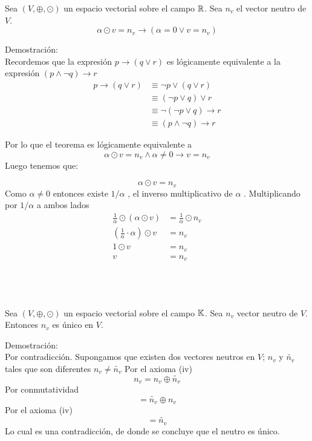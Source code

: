 \begin{theorem}

Sea $(V,\oplus ,\odot )$ un espacio vectorial sobre el campo $\mathbb{R}$. Sea $n_v$ el vector neutro de $V$.
$$\alpha \odot v=n_v   \rightarrow  (  \alpha =0   \vee    v=n_v   )$$
\end{theorem}
Demostración:~\\

Recordemos que la expresión $ p\rightarrow (q\vee r)$ es lógicamente equivalente a la expresión $(p\wedge \neg q)\rightarrow r$
\begin{align*}
    p\rightarrow(q\vee r)&\equiv  \neg p\vee (q\vee r)\\
    &\equiv  (\neg p\vee q)\vee r\\
    &\equiv  \neg (\neg p\vee q)\rightarrow r\\
    &\equiv  (p\wedge \neg q)\rightarrow r
\end{align*}

Por lo que el teorema es lógicamente equivalente a 
$$\alpha \odot v=n_v  \wedge  \alpha \neq 0  \rightarrow   v=n_v $$  
Luego tenemos que:

$$\alpha \odot v=n_v$$
Como $ \alpha \neq 0$ entonces existe $1/\alpha$ , el inverso multiplicativo de $\alpha$ . Multiplicando por $1/\alpha $ a ambos lados 
\begin{align*}
    \frac{1}{\alpha} \odot (\alpha \odot v)&=\frac{1}{\alpha} \odot n_v\\
    \left(\frac{1}{\alpha} \cdot \alpha \right)\odot v&=n_v\\
    1\odot v&=n_v\\
    v&=n_v\\
\end{align*}


~\\
~\\


\begin{theorem}
Sea $(V,\oplus ,\odot )$ un espacio vectorial sobre el campo $\mathbb{K}$. Sea $ n_v$ vector neutro de $V$. Entonces $n_v$ es único en $V$.
\end{theorem}
Demostración:
~\\

Por contradicción. Supongamos que existen dos vectores neutros en $V$; $n_v$ y $\widetilde{n_v}$ tales que son diferentes $n_v\neq \widetilde{n_v}$
Por el axioma (iv)
$$n_v=n_v\oplus \widetilde{n_v} $$
Por conmutatividad
$$=\widetilde{n_v} \oplus n_v  $$
Por el axioma (iv)
$$=\widetilde{n_v} $$
Lo cual es una contradicción, de donde se concluye que el neutro es único.



